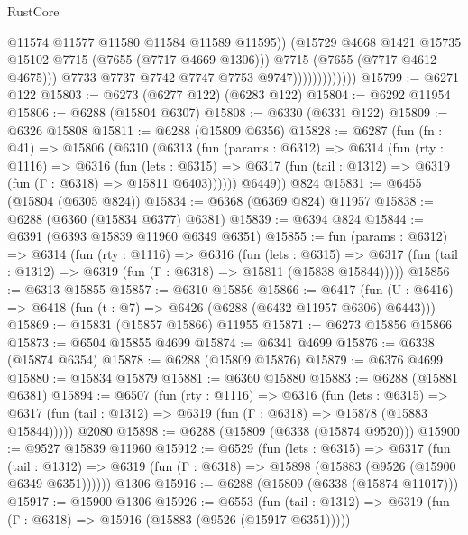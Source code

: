 \begin{lexlean}{RustCore}
\begin{coremodule}
                                    @11574
                                    @11577
                                    @11580
                                    @11584
                                    @11589
                                    @11595))
                                (@15729 @4668 @1421 @15735 @15102 @7715 (@7655 (@7717 @4669 @1306)))
                                @7715
                                (@7655 (@7717 @4612 @4675)))
                              @7733
                              @7737
                              @7742
                              @7747
                              @7753
                              @9747)))))))))))))
@15799 := @6271 @122
@15803 := @6273 (@6277 @122) (@6283 @122)
@15804 := @6292 @11954
@15806 := @6288 (@15804 @6307)
@15808 := @6330 (@6331 @122)
@15809 := @6326 @15808
@15811 := @6288 (@15809 @6356)
@15828 := @6287
    (fun (fn : @41) =>
    @15806
      (@6310
        (@6313
          (fun (params : @6312) =>
          @6314
            (fun (rty : @1116) =>
            @6316
              (fun (lets : @6315) =>
              @6317 (fun (tail : @1312) => @6319 (fun (Γ : @6318) => @15811 @6403))))))
        @6449))
    @824
@15831 := @6455 (@15804 (@6305 @824))
@15834 := @6368 (@6369 @824) @11957
@15838 := @6288 (@6360 (@15834 @6377) @6381)
@15839 := @6394 @824
@15844 := @6391 (@6393 @15839 @11960 @6349 @6351)
@15855 := fun (params : @6312) =>
  @6314
    (fun (rty : @1116) =>
    @6316
      (fun (lets : @6315) =>
      @6317 (fun (tail : @1312) => @6319 (fun (Γ : @6318) => @15811 (@15838 @15844)))))
@15856 := @6313 @15855
@15857 := @6310 @15856
@15866 := @6417
    (fun (U : @6416) => @6418 (fun (t : @7) => @6426 (@6288 (@6432 @11957 @6306) @6443)))
@15869 := @15831 (@15857 @15866) @11955
@15871 := @6273 @15856 @15866
@15873 := @6504 @15855 @4699
@15874 := @6341 @4699
@15876 := @6338 (@15874 @6354)
@15878 := @6288 (@15809 @15876)
@15879 := @6376 @4699
@15880 := @15834 @15879
@15881 := @6360 @15880
@15883 := @6288 (@15881 @6381)
@15894 := @6507
    (fun (rty : @1116) =>
    @6316
      (fun (lets : @6315) =>
      @6317 (fun (tail : @1312) => @6319 (fun (Γ : @6318) => @15878 (@15883 @15844)))))
    @2080
@15898 := @6288 (@15809 (@6338 (@15874 @9520)))
@15900 := @9527 @15839 @11960
@15912 := @6529
    (fun (lets : @6315) =>
    @6317
      (fun (tail : @1312) =>
      @6319 (fun (Γ : @6318) => @15898 (@15883 (@9526 (@15900 @6349 @6351))))))
    @1306
@15916 := @6288 (@15809 (@6338 (@15874 @11017)))
@15917 := @15900 @1306
@15926 := @6553
    (fun (tail : @1312) => @6319 (fun (Γ : @6318) => @15916 (@15883 (@9526 (@15917 @6351)))))

\end{coremodule}
\end{lexlean}
